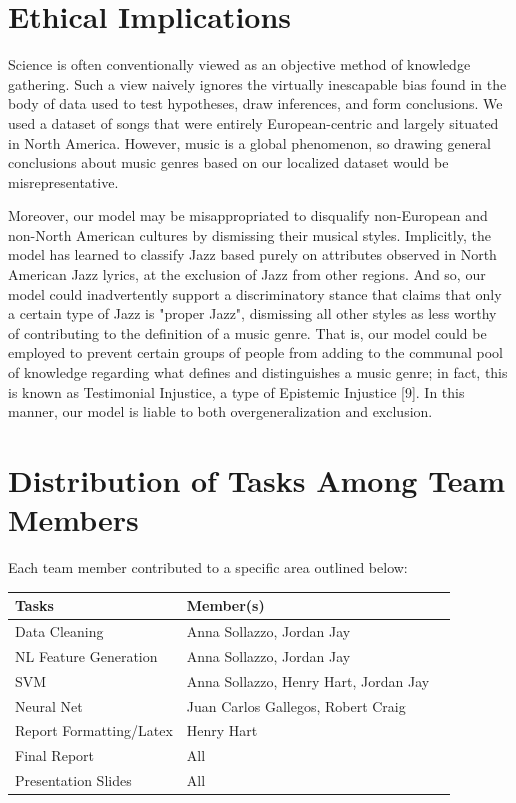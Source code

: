 \documentclass[journal]{IEEEtran}
\begin{document}
\section{Ethical Implications}

Science is often conventionally viewed as an objective method of knowledge gathering. Such a view naively ignores the virtually inescapable bias found in the body of data used to test hypotheses, draw inferences, and form conclusions. We used a dataset of songs that were entirely European-centric and largely situated in North America. However, music is a global phenomenon, so drawing general conclusions about music genres based on our localized dataset would be misrepresentative.

Moreover, our model may be misappropriated to disqualify non-European and non-North American cultures by dismissing their musical styles. Implicitly, the model has learned to classify Jazz based purely on attributes observed in North American Jazz lyrics, at the exclusion of Jazz from other regions. And so, our model could inadvertently support a discriminatory stance that claims that only a certain type of Jazz is "proper Jazz", dismissing all other styles as less worthy of contributing to the definition of a music genre. That is, our model could be employed to prevent certain groups of people from adding to the communal pool of knowledge regarding what defines and distinguishes a music genre; in fact, this is known as Testimonial Injustice, a type of Epistemic Injustice [9]. In this manner, our model is liable to both overgeneralization and exclusion.

\newpage
\section{Distribution of Tasks Among Team Members}

Each team member contributed to a specific area outlined below:

\begin{table}[h!]
    \label{tab:table1}
    \begin{tabular}{l|l|l|}
      \textbf{Tasks} & \textbf{Member(s)}\\

      \hline
	Data Cleaning & Anna Sollazzo, Jordan Jay\\
	NL Feature Generation & Anna Sollazzo, Jordan Jay\\
	SVM & Anna Sollazzo, Henry Hart, Jordan Jay\\
	Neural Net & Juan Carlos Gallegos, Robert Craig\\
	Report Formatting/Latex & Henry Hart\\
	Final Report & All\\
	Presentation Slides & All\\

    \end{tabular}
\end{table}
\end{document}
